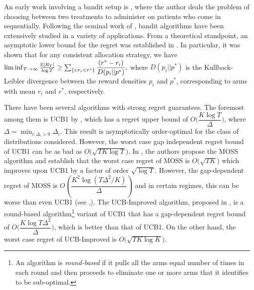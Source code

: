 
An early work involving a bandit setup is \cite{thompson1933likelihood}, where the author deals the problem of choosing between two treatments to administer on patients who come in sequentially. Following the seminal work of  \cite{robbins1952some}, bandit algorithms have been extensively studied in a variety of applications. 
From a theoretical standpoint, an asymptotic lower bound for the regret was established in \cite{lai1985asymptotically}. In particular, it was shown that for any consistent allocation strategy, we have
$\liminf_{T \to \infty}\frac{\mathbb{E}[R_{T}]}{\log T}\geq\sum_{\{i:r_{i}<r^{*}\}}\dfrac{(r^{*}-r_{i})}{D(p_{i}||p^{*})},$
where $D(p_{i}||p^{*})$ is the Kullback-Leibler divergence between the reward densities $p_{i}$ and $p^{*}$, corresponding to arms with mean $r_{i}$ and $r^{*}$, respectively.

	There have been several algorithms with strong regret guarantees. The foremost among them is UCB1 by  \cite{auer2002finite}, which has a regret upper bound of $O\bigg(\dfrac{K\log T}{\Delta}\bigg)$, where $\Delta = \min_{i:\Delta_i>0} \Delta_i$. This result is asymptotically order-optimal for the class of distributions considered. However, the worst case gap independent regret bound of UCB1  can be as bad as $O \bigg(\sqrt{TK\log T}\bigg)$.  In \cite{audibert2009minimax}, the authors propose the MOSS algorithm and establish that the worst case regret of MOSS is $O\bigg(\sqrt{TK}\bigg)$ which improves upon UCB1 by a factor of order $\sqrt{\log T}$. However, the gap-dependent regret of MOSS is  $O\left(\dfrac{K^{2}\log\left(T\Delta^{2}/K\right)}{\Delta}\right)$ and in certain regimes, this can be worse than even UCB1 (see \cite{audibert2009minimax},\cite{lattimore2015optimally}). The UCB-Improved algorithm, proposed in \cite{auer2010ucb}, is a round-based algorithm\footnote{An algorithm is \textit{round-based} if it pulls all the arms equal number of times in each round and then proceeds to eliminate one or more arms that it identifies to be sub-optimal.} variant of UCB1 that 
has a gap-dependent regret bound of $O\bigg(\dfrac{K\log T\Delta^{2}}{\Delta}\bigg)$, which is better than that of UCB1. On the other hand, the worst case regret of UCB-Improved is $O\bigg(\sqrt{TK\log K}\bigg)$. 

